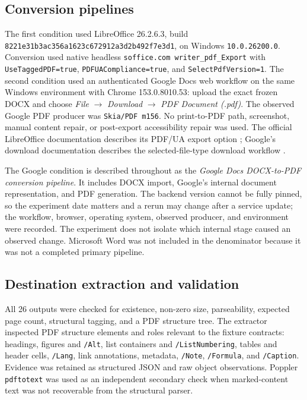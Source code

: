 \subsection{Conversion pipelines}

The first condition used LibreOffice 26.2.6.3, build \texttt{8221e31b3ac356a1623c672912a3d2b492f7e3d1}, on Windows \texttt{10.0.26200.0}. Conversion used native headless \texttt{soffice.com writer\_pdf\_Export} with \texttt{UseTaggedPDF=true}, \texttt{PDFUACompliance=true}, and \texttt{SelectPdfVersion=1}. The second condition used an authenticated Google Docs web workflow on the same Windows environment with Chrome 153.0.8010.53: upload the exact frozen DOCX and choose \textit{File} $\rightarrow$ \textit{Download} $\rightarrow$ \textit{PDF Document (.pdf)}. The observed Google PDF producer was \texttt{Skia/PDF m156}. No print-to-PDF path, screenshot, manual content repair, or post-export accessibility repair was used. The official LibreOffice documentation describes its PDF/UA export option \cite{libreoffice-pdfua}; Google's download documentation describes the selected-file-type download workflow \cite{google-docs-download}.

The Google condition is described throughout as the \emph{Google Docs DOCX-to-PDF conversion pipeline}. It includes DOCX import, Google's internal document representation, and PDF generation. The backend version cannot be fully pinned, so the experiment date matters and a rerun may change after a service update; the workflow, browser, operating system, observed producer, and environment were recorded. The experiment does not isolate which internal stage caused an observed change. Microsoft Word was not included in the denominator because it was not a completed primary pipeline.

\subsection{Destination extraction and validation}

All 26 outputs were checked for existence, non-zero size, parseability, expected page count, structural tagging, and a PDF structure tree. The extractor inspected PDF structure elements and roles relevant to the fixture contracts: headings, figures and \texttt{/Alt}, list containers and \texttt{/ListNumbering}, tables and header cells, \texttt{/Lang}, link annotations, metadata, \texttt{/Note}, \texttt{/Formula}, and \texttt{/Caption}. Evidence was retained as structured JSON and raw object observations. Poppler \texttt{pdftotext} was used as an independent secondary check when marked-content text was not recoverable from the structural parser.

